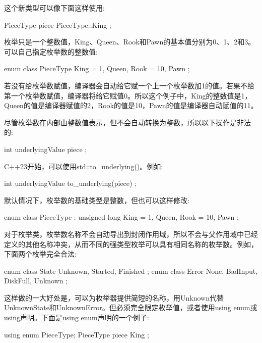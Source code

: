 这个新类型可以像下面这样使用:

\begin{cpp}
PieceType piece { PieceType::King };
\end{cpp}

枚举只是一个整数值，King、Queen、Rook和Pawn的基本值分别为0、1、2和3。可以自己指定枚举数的整数值:

\begin{cpp}
enum class PieceType
{
    King = 1,
    Queen,
    Rook = 10,
    Pawn
};
\end{cpp}

若没有给枚举数赋值，编译器会自动给它赋一个上一个枚举数加1的值。若果不给第一个枚举数赋值，编译器将给它赋值0。所以这个例子中，King的整数值是1，Queen的值是编译器赋值的2，Rook的值是10，Pawn的值是编译器自动赋值的11。

尽管枚举数在内部由整数值表示，但不会自动转换为整数，所以以下操作是非法的:

\begin{cpp}
int underlyingValue { piece };
\end{cpp}


C++23开始，可以使用std::to\_underlying()。例如:

\begin{cpp}
int underlyingValue { to_underlying(piece) };
\end{cpp}

默认情况下，枚举数的基础类型是整数，但也可以这样修改:

\begin{cpp}
enum class PieceType : unsigned long
{
    King = 1,
    Queen,
    Rook = 10,
    Pawn
};
\end{cpp}

对于枚举类，枚举数名称不会自动导出到封闭作用域，所以不会与父作用域中已经定义的其他名称冲突，从而不同的强类型枚举可以具有相同名称的枚举数。例如，下面两个枚举完全合法:

\begin{cpp}
enum class State { Unknown, Started, Finished };
enum class Error { None, BadInput, DiskFull, Unknown };
\end{cpp}

这样做的一大好处是，可以为枚举器提供简短的名称，用Unknown代替UnknownState和UnknownError。但必须完全限定枚举值，或者使用using enum或using声明。下面是using enum声明的一个例子:

\begin{cpp}
using enum PieceType;
PieceType piece { King };
\end{cpp}

